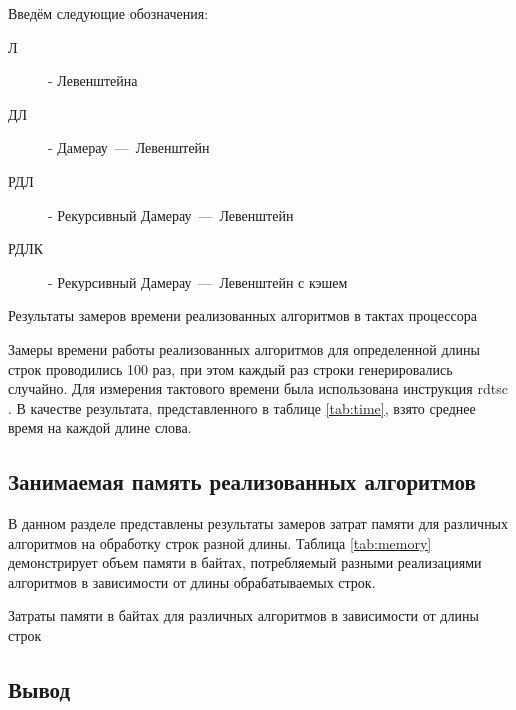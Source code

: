 Введём следующие обозначения:
\begin{description}
	\item[Л] - Левенштейна
	\item[ДЛ] - Дамерау~---~Левенштейн
	\item[РДЛ] - Рекурсивный Дамерау~---~Левенштейн
	\item[РДЛК] - Рекурсивный Дамерау~---~Левенштейн с кэшем
\end{description}

\begin{table}[hbtp]
	\centering
	\caption{Результаты замеров времени реализованных алгоритмов в тактах процессора}
	\label{tab:time}
\end{table}

Замеры времени работы реализованных алгоритмов для определенной длины строк проводились 100 раз, при этом каждый раз строки генерировались случайно.
Для измерения тактового времени была использована инструкция rdtsc \cite{microsoft_rdtsc}.
В качестве результата, представленного в таблице \ref{tab:time}, взято среднее время на каждой длине слова.

\pagebreak
\newpage

\subsection{Занимаемая память реализованных алгоритмов}

В данном разделе представлены результаты замеров затрат памяти для различных алгоритмов на обработку строк разной длины. 
Таблица \ref{tab:memory} демонстрирует объем памяти в байтах, потребляемый разными реализациями алгоритмов в зависимости от длины обрабатываемых строк.

\begin{table}[ht]
	\centering
	\caption{Затраты памяти в байтах для различных алгоритмов в зависимости от длины строк}
	\label{tab:memory}
\end{table}

\subsection{Вывод}

